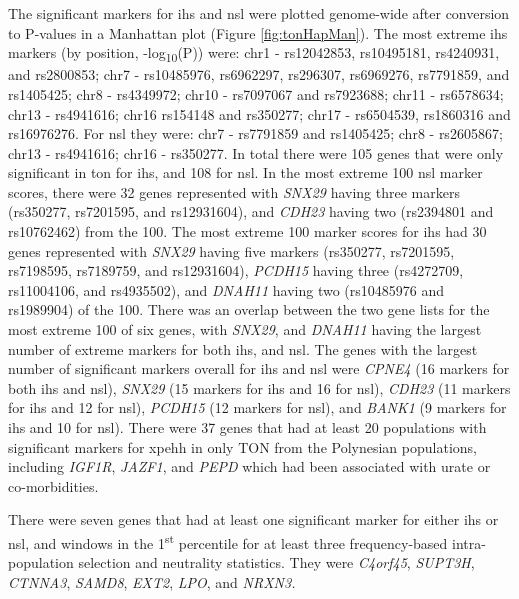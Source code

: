 \documentclass[twoside,openright]{report}
\begin{document}
The significant markers for \gls{ihs} and \gls{nsl} were plotted
genome-wide after conversion to P-values in a Manhattan plot (Figure
\ref{fig:tonHapMan}). The most extreme \gls{ihs} markers (by position,
-log\textsubscript{10}(P)) were: chr1 - rs12042853, rs10495181,
rs4240931, and rs2800853; chr7 - rs10485976, rs6962297, rs296307,
rs6969276, rs7791859, and rs1405425; chr8 - rs4349972; chr10 - rs7097067
and rs7923688; chr11 - rs6578634; chr13 - rs4941616; chr16 rs154148 and
rs350277; chr17 - rs6504539, rs1860316 and rs16976276. For \gls{nsl}
they were: chr7 - rs7791859 and rs1405425; chr8 - rs2605867; chr13 -
rs4941616; chr16 - rs350277. In total there were 105 genes that were
only significant in \gls{ton} for \gls{ihs}, and 108 for \gls{nsl}. In
the most extreme 100 \gls{nsl} marker scores, there were 32 genes
represented with \emph{SNX29} having three markers (rs350277, rs7201595,
and rs12931604), and \emph{CDH23} having two (rs2394801 and rs10762462)
from the 100. The most extreme 100 marker scores for \gls{ihs} had 30
genes represented with \emph{SNX29} having five markers (rs350277,
rs7201595, rs7198595, rs7189759, and rs12931604), \emph{PCDH15} having
three (rs4272709, rs11004106, and rs4935502), and \emph{DNAH11} having
two (rs10485976 and rs1989904) of the 100. There was an overlap between
the two gene lists for the most extreme 100 of six genes, with
\emph{SNX29}, and \emph{DNAH11} having the largest number of extreme
markers for both \gls{ihs}, and \gls{nsl}. The genes with the largest
number of significant markers overall for \gls{ihs} and \gls{nsl} were
\emph{CPNE4} (16 markers for both \gls{ihs} and \gls{nsl}), \emph{SNX29}
(15 markers for \gls{ihs} and 16 for \gls{nsl}), \emph{CDH23} (11
markers for \gls{ihs} and 12 for \gls{nsl}), \emph{PCDH15} (12 markers
for \gls{nsl}), and \emph{BANK1} (9 markers for \gls{ihs} and 10 for
\gls{nsl}). There were 37 genes that had at least 20 populations with
significant markers for \gls{xpehh} in only TON from the Polynesian
populations, including \emph{IGF1R}, \emph{JAZF1}, and \emph{PEPD} which
had been associated with urate or co-morbidities.

There were seven genes that had at least one significant marker for
either \gls{ihs} or \gls{nsl}, and windows in the 1\textsuperscript{st}
percentile for at least three frequency-based intra-population selection
and neutrality statistics. They were \emph{C4orf45}, \emph{SUPT3H},
\emph{CTNNA3}, \emph{SAMD8}, \emph{EXT2}, \emph{LPO}, and \emph{NRXN3.}
\end{document}
